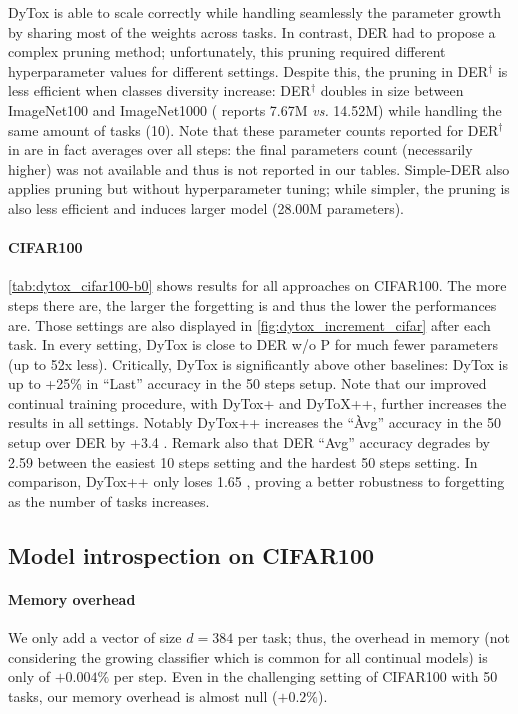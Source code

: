 DyTox is able to scale correctly while handling seamlessly the parameter growth by sharing most of
the weights across tasks. In contrast, DER had to propose a complex pruning method; unfortunately,
this pruning required different hyperparameter values for different settings. Despite this, the
pruning in DER$^\dagger$ is less efficient when classes diversity increase: DER$^\dagger$ doubles in
size between ImageNet100 and ImageNet1000 (\citet{yan2021der} reports 7.67M \textit{vs.} 14.52M)
while handling the same amount of tasks (10). Note that these parameter counts reported for
DER$^\dagger$ in \citet{yan2021der} are in fact averages over all steps: the final parameters count
(necessarily higher) was not available and thus is not reported in our tables. Simple-DER also
applies pruning but without hyperparameter tuning; while simpler, the pruning is also less efficient
and induces larger model (28.00M parameters).

\paragraph{CIFAR100} \autoref{tab:dytox_cifar100-b0} shows results for all approaches on CIFAR100. The
more steps there are, the larger the forgetting is and thus the lower the performances are. Those
settings are also displayed in \autoref{fig:dytox_increment_cifar} after each task. In every setting,
DyTox is close to DER w/o P  for much fewer parameters (up to 52x less). Critically, DyTox is
significantly above other baselines: \eg DyTox is up to +25\% in ``Last'' accuracy in the
50 steps setup. Note that our improved continual training procedure, with DyTox+ and DyToX++,
further increases the results in all settings. Notably DyTox++ increases the ``Àvg'' accuracy in the
50 setup over DER by +3.4 \pp. Remark also that DER ``Avg'' accuracy degrades by 2.59 \pp between
the easiest 10 steps setting and the hardest 50 steps setting. In comparison, DyTox++ only loses
1.65 \pp, proving a better robustness to forgetting as the number of tasks increases.

\subsection{Model introspection on CIFAR100}

\paragraph{Memory overhead}
We only add a vector of size $d=384$ per task; thus, the overhead in memory (not considering the
growing classifier which is common for all continual models) is only of $+0.004\%$ per step. Even in
the challenging setting of CIFAR100 with 50 tasks, our memory overhead is almost null ($+0.2\%$).


